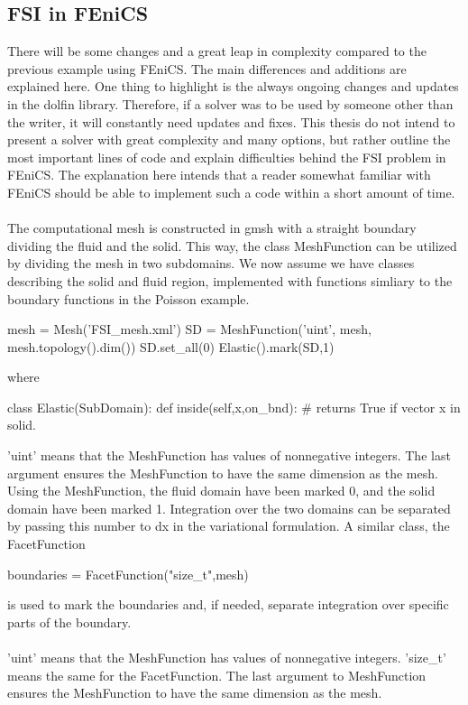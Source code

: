 \subsection{FSI in FEniCS}
There will be some changes and a great leap in complexity compared to the previous example using FEniCS. The main differences and additions are explained here. One thing to highlight is the always ongoing changes and updates in the dolfin library. Therefore, if a solver was to be used by someone other than the writer, it will constantly need updates and fixes. This thesis do not intend to present a solver with great complexity and many options, but rather outline the most important lines of code and explain difficulties behind the FSI problem in FEniCS. The explanation here intends that a reader somewhat familiar with FEniCS should be able to implement such a code within a short amount of time. 
\\
\\
The computational mesh is constructed in gmsh with a straight boundary dividing the fluid and the solid. This way, the class MeshFunction can be utilized by dividing the mesh in two subdomains. We now assume we have classes describing the solid and fluid region, implemented with functions simliary to the boundary functions in the Poisson example. 
\begin{cverbatim}
mesh = Mesh('FSI_mesh.xml')
SD = MeshFunction('uint', mesh, mesh.topology().dim())
SD.set_all(0)
Elastic().mark(SD,1)
\end{cverbatim}
where 
\begin{cverbatim}
class Elastic(SubDomain):
	def inside(self,x,on_bnd):
		# returns True if vector x in solid.
\end{cverbatim}
'uint' means that the MeshFunction has values of nonnegative integers. The last argument ensures the MeshFunction to have the same dimension as the mesh. \\
Using the MeshFunction, the fluid domain have been marked 0, and the solid domain have been marked 1. Integration over the two domains can be separated by passing this number to dx in the variational formulation. A similar class, the FacetFunction
\begin{cverbatim}
boundaries = FacetFunction("size_t",mesh)
\end{cverbatim}
is used to mark the boundaries and, if needed, separate integration over specific parts of the boundary.
\\
\\'uint' means that the MeshFunction has values of nonnegative integers. 'size\_t' means the same for the FacetFunction. The last argument to MeshFunction ensures the MeshFunction to have the same dimension as the mesh. 
